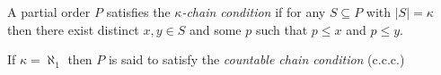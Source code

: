 \documentclass[12pt]{article}
\begin{document}
A partial order $P$ satisfies the \emph{$\kappa$-chain condition} if for any $S\subseteq P$ with $|S|=\kappa$ then there exist distinct $x,y\in S$ and some $p$ such that $p\leq x$ and $p\leq y$.

If $\kappa=\aleph_1$ then $P$ is said to satisfy the \emph{countable chain condition} (c.c.c.)
\end{document}
